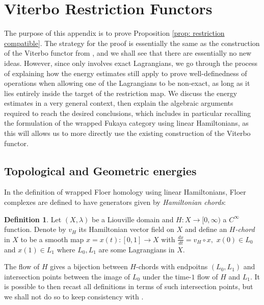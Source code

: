 \documentclass{article}
\theoremstyle{plain}%
\theoremstyle{definition}
\newtheorem{dfn}[thm]{Definition}
\numberwithin{equation}{section}
\numberwithin{figure}{section}
\def\la{\lambda}
\def\iy{\infty}
\def\cm{\circ}
\begin{document}
\appendix

\section{Viterbo Restriction Functors}

The purpose of this appendix is to prove Proposition \ref{prop: restriction compatible}. The strategy for the proof is essentially the same as the construction of the Viterbo functor from  \cite{AS}, and we shall see that there are essentially no new ideas. However, since \cite{AS} only involves exact Lagrangians, we go through the process of explaining how the energy estimates still apply to prove well-definedness of operations when allowing one of the Lagrangians to be non-exact, as long as it lies entirely inside the target of the restriction map. We discuss the energy estimates in a very general context, then explain the algebraic arguments required to reach the desired conclusions, which includes in particular recalling the formulation of the wrapped Fukaya category using linear Hamiltonians, as this will allows us to more directly use the existing construction of the Viterbo functor.

\subsection{Topological and Geometric energies}
\label{sec:topol-geom-energ}

In the definition of wrapped Floer homology using linear Hamiltonians, Floer complexes are defined to have generators given by \emph{Hamiltonian chords}:
\begin{dfn}
Let $(X,\la)$ be a Liouville domain and $H:X\to[0,\infty)$ a $C^\iy$ function. Denote by $v_H$ its Hamiltonian vector field on $X$ and define an {\it $H$-chord} in $X$ to be a smooth map $x=x(t):[0,1]\to X$ with $\frac{dx}{dt}=v_H\cm x,$ $x(0)\in L_0$ and $x(1)\in L_1$ where $L_0,L_1$ are some Lagrangians in $X.$
\end{dfn}
The flow of $H$ gives a bijection between $H$-chords with endpoitns $(L_0,L_1)$ and intersection points between the image of $L_0$ under the time-$1$ flow of $H$ and $L_1$. It is possible to then recast all definitions in terms of such intersection points, but we shall not do so to keep consistency with  \cite{AS}.
\end{document}
